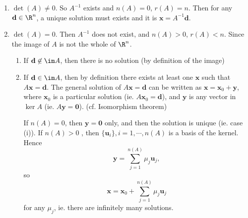 \documentclass[a4paper]{article}
\begin{document}
\begin{enumerate}
  \item $\det(A) \not= 0$. So $A^{-1}$ exists and $n(A) = 0$, $r(A) = n$. Then for any $\mathbf{d}\in \R^n$, a unique solution must exists and it is $\mathbf{x} = A^{-1}\mathbf{d}$.
  \item $\det(A) = 0$. Then $A^{-1}$ does not exist, and $n(A) > 0$, $r(A) < n$. Since the image of $A$ is not the whole of $\R^n$.
    \begin{enumerate}
      \item If $\mathbf{d}\not\in \im A$, then there is no solution (by definition of the image)
      \item If $\mathbf{d}\in \im A$, then by definition there exists at least one $\mathbf{x}$ such that $A\mathbf{x} = \mathbf{d}$. The general solution of $A\mathbf{x} = \mathbf{d}$ can be written as $\mathbf{x} = \mathbf{x}_0 + \mathbf{y}$, where $\mathbf{x}_0$ is a particular solution (ie. $A\mathbf{x}_0 = \mathbf{d}$), and $\mathbf{y}$ is any vector in $\ker A$ (ie. $A\mathbf{y} = \mathbf{0}$). (cf. Isomorphism theorem)

        If $n(A) = 0$, then $\mathbf{y = 0}$ only, and then the solution is unique (ie. case (i)). If $n(A) > 0$ , then $\{\mathbf{u}_i\}, i = 1, \cdots, n(A)$ is a basis of the kernel. Hence
        \[
          \mathbf{y} = \sum_{j = 1}^{n(A)} \mu_j \mathbf{u}_j,
        \]
        so
        \[
          \mathbf{x} = \mathbf{x}_0 + \sum_{j = 1}^{n(A)} \mu_j \mathbf{u}_j
        \]
        for any $\mu_j$, ie. there are infinitely many solutions.
    \end{enumerate}
\end{enumerate}
\end{document}
